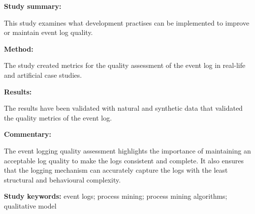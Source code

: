 \begin{tcolorbox}[colback=gray!5!white, colframe=pastelgreen!40!black, title=Towards a better assessment of event logs quality\cite{Kherbouche2017}]
	\begin{minipage}[t]{0.25\textwidth}
		\textbf{Study summary:}
	\end{minipage}
	\hfill
	\begin{minipage}[t]{0.65\textwidth}
		This study examines what development practises can be implemented to improve or maintain
event log quality.
	\end{minipage}

	\vspace{0.75em} 

	\begin{minipage}[t]{0.25\textwidth}
		\textbf{Method:}
	\end{minipage}
	\hfill
	\begin{minipage}[t]{0.65\textwidth}
		The study created metrics for the quality assessment of the event log in real-life and artificial case studies.
	\end{minipage}

	\vspace{0.75em} 

	\begin{minipage}[t]{0.25\textwidth}
		\textbf{Results:}
	\end{minipage}
	\hfill
	\begin{minipage}[t]{0.65\textwidth}
		The results have been validated with natural and synthetic data that validated the quality metrics of the event log.	
	\end{minipage}

	\vspace{0.75em} 

	\begin{minipage}[t]{0.25\textwidth}
		\textbf{Commentary:}
	\end{minipage}
	\hfill
	\begin{minipage}[t]{0.65\textwidth}
		The event logging quality assessment highlights the importance of maintaining an acceptable
log quality to make the logs consistent and complete. It also ensures that the logging mechanism can accurately capture the logs with the least structural and behavioural complexity. 
	\end{minipage}
	\tcblower
	\textbf{Study keywords:} event logs; process mining; process mining algorithms; qualitative
model
\end{tcolorbox}

